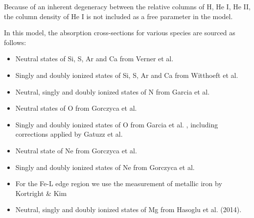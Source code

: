 			Because of an inherent degeneracy between the relative columns of H, He I, He II, the column density of He I is not included as a free parameter in the model.
			
			In this model, the absorption cross-sections for various species are sourced as follows:
			\begin{itemize}
				\item Neutral states of Si, S, Ar and Ca from Verner et al. \cite{vernerXS}
				\item Singly and doubly ionized states of Si, S, Ar and Ca from Witthoeft et al. \cite{witthoeftXS1,witthoeftXS2}
				\item Neutral, singly and doubly ionized states of N from Garcia et al. \cite{garciaXS1}
				\item Neutral states of O from Gorczyca et al. \cite{gorczycaXS1}
				\item Singly and doubly ionized states of O from Garcia et al. \cite{garciaXS2}, including corrections applied by Gatuzz et al. \cite{gatuzzXS}
				\item Neutral state of Ne from Gorczyca et al. \cite{gorczycaXS2}
				\item Singly and doubly ionized states of Ne from Gorczyca et al. \cite{gorczycaXS3}
				\item For the Fe-L edge region we use the measurement of metallic iron by Kortright \& Kim \cite{kortrightXS}
				\item Neutral, singly and doubly ionized states of Mg from Hasoglu et al. (2014).
			\end{itemize}
			
